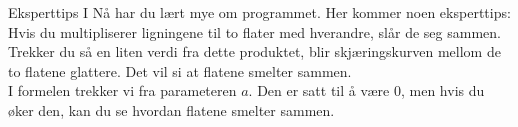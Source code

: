 \begin{surferPage}{Eksperttips I}
Nå har du lært mye om programmet. Her kommer noen eksperttips:\\
\vspace{0.3cm}
Hvis du multipliserer ligningene til to flater med hverandre, slår de seg sammen. Trekker du så en liten verdi fra dette produktet, blir skjæringskurven mellom de to flatene glattere. Det vil si at flatene smelter sammen.\\
\vspace{0.3cm}
I formelen trekker vi fra parameteren $a$. Den er satt til å være $0$, men hvis du øker den, kan du se hvordan flatene smelter sammen.
\end{surferPage}
